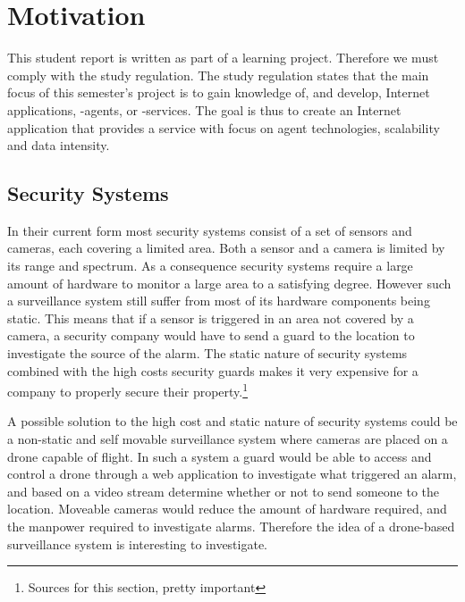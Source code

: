 \section{Motivation}
This student report is written as part of a learning project. Therefore we must comply with the study regulation.
The study regulation states that the main focus of this semester's project is to gain knowledge of, and develop, Internet applications, -agents, or -services.
The goal is thus to create an Internet application that provides a service with focus on agent technologies, scalability and data intensity.

\subsection{Security Systems}
In their current form most security systems consist of a set of sensors and cameras, each covering a limited area.
Both a sensor and a camera is limited by its range and spectrum.
As a consequence security systems require a large amount of hardware to monitor a large area to a satisfying degree.
However such a surveillance system still suffer from most of its hardware components being static.
This means that if a sensor is triggered in an area not covered by a camera, a security company would have to send a guard to the location to investigate the source of the alarm.
The static nature of security systems combined with the high costs security guards makes it very expensive for a company to properly secure their property.\footnote{Sources for this section, pretty important}

A possible solution to the high cost and static nature of security systems could be a non-static and self movable surveillance system where cameras are placed on a drone capable of flight.
In such a system a guard would be able to access and control a drone through a web application to investigate what triggered an alarm, and based on a video stream determine whether or not to send someone to the location.
Moveable cameras would reduce the amount of hardware required, and the manpower required to investigate alarms.
Therefore the idea of a drone-based surveillance system is interesting to investigate.





